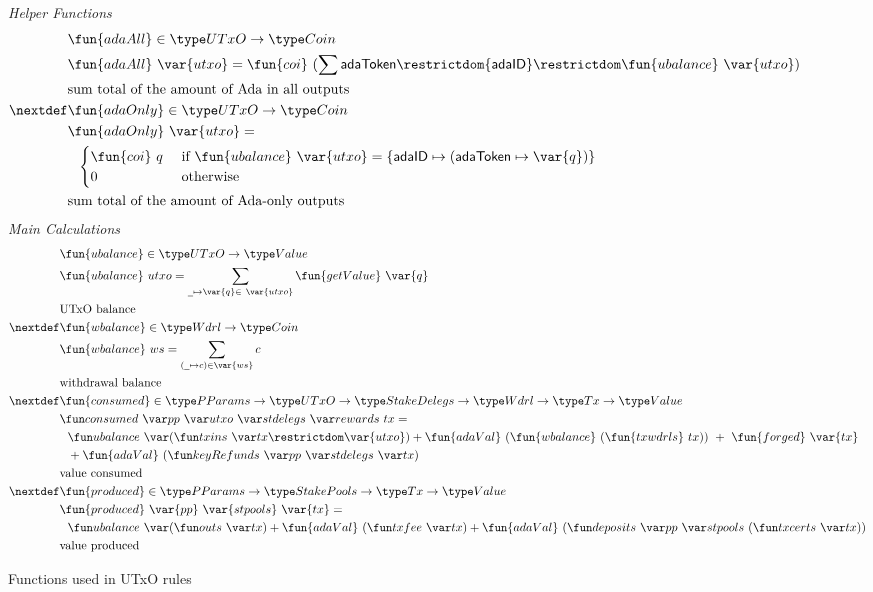 \begin{figure}[htb]
  \emph{Helper Functions}
  \begin{align*}
    & \fun{adaAll} \in \UTxO \to \Coin \\
    & \fun{adaAll}~{\var{utxo}} = \fun{coi}~
          (\sum  {\mathsf{adaToken}} \restrictdom {\mathsf{adaID}} \restrictdom
          \fun{ubalance}~\var{utxo}) \\
    & \text{sum total of the amount of Ada in all outputs} \\
    \nextdef
    & \fun{adaOnly} \in \UTxO \to \Coin \\
    & \fun{adaOnly}~{\var{utxo}} = \\
    & ~~\begin{cases}
          \fun{coi}~{q} ~& \text{if}~\fun{ubalance}~\var{utxo} = \{\mathsf{adaID} \mapsto
          (\mathsf{adaToken} \mapsto \var{q})\} \\
          0 & \text{otherwise}
      \end{cases}\\
    & \text{sum total of the amount of Ada-only outputs} \\
  \end{align*}
  \emph{Main Calculations}
  \begin{align*}
    & \fun{ubalance} \in \UTxO \to \Value \\
    & \fun{ubalance} ~ utxo = \sum_{\wcard\mapsto\var{q}\in~\var{utxo}}
    \fun{getValue}~\var{q} \\
    & \text{UTxO balance} \\
    \nextdef
    & \fun{wbalance} \in \Wdrl \to \Coin \\
    & \fun{wbalance} ~ ws = \sum_{(\wcard\mapsto c)\in\var{ws}} c \\
    & \text{withdrawal balance} \\
    \nextdef
    & \fun{consumed} \in \PParams \to \UTxO \to \StakeDelegs \to \Wdrl \to \Tx \to \Value \\
    & \consumed{pp}{utxo}{stdelegs}{rewards}~{tx} = \\
    & ~~\ubalance{(\txins{tx} \restrictdom \var{utxo})} +
        \fun{adaVal}~(\fun{wbalance}~(\fun{txwdrls}~{tx}))~+~\fun{forged}~\var{tx} \\
    & ~~ + \fun{adaVal}~(\keyRefunds{pp}{stdelegs}{tx}) \\
    & \text{value consumed} \\
    \nextdef
    & \fun{produced} \in \PParams \to \StakePools \to \Tx \to \Value \\
    & \fun{produced}~\var{pp}~\var{stpools}~\var{tx} = \\
    &~~\ubalance{(\outs{tx})}
    + \fun{adaVal}~(\txfee{tx}) + \fun{adaVal}~(\deposits{pp}{stpools}~{(\txcerts{tx})})\\
    & \text{value produced} \\
  \end{align*}
  \caption{Functions used in UTxO rules}
  \label{fig:functions:utxo}
\end{figure}


